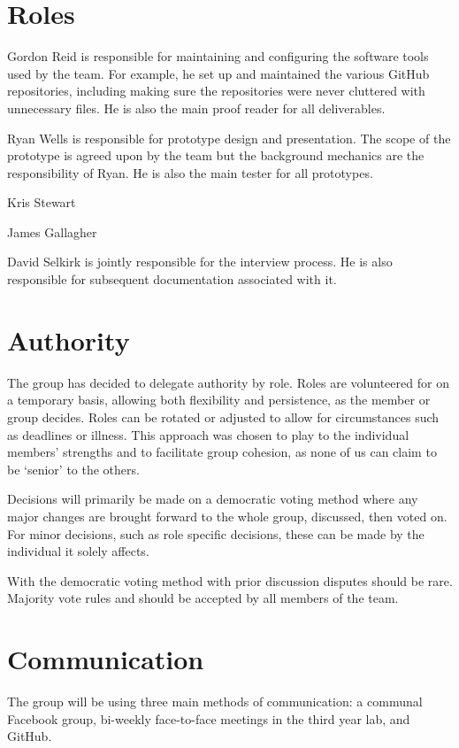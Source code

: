 \documentclass{l3deliverable}
\begin{document}
\pagebreak

\section{Roles}

Gordon Reid is responsible for maintaining and configuring the software tools
used by the team. For example, he set up and maintained the various GitHub
repositories, including making sure the repositories were never cluttered
with unnecessary files. He is also the main proof reader for all
deliverables.

Ryan Wells is responsible for prototype design and presentation. The scope
of the prototype is agreed upon by the team but the background mechanics
are the responsibility of Ryan. He is also the main tester for all prototypes.

Kris Stewart

James Gallagher

David Selkirk is jointly responsible for the interview process. He is also responsible
for subsequent documentation associated with it.

\section{Authority}

The group has decided to delegate authority by role. Roles are volunteered for
on a temporary basis, allowing both flexibility and persistence, as the
member or group decides. Roles can be rotated or adjusted to allow for
circumstances such as deadlines or illness. This approach was chosen to play
to the individual members' strengths and to facilitate group cohesion, as none
of us can claim to be `senior' to the others.

Decisions will primarily be made on a democratic voting method where any
major changes are brought forward to the whole group, discussed, then voted
on. For minor decisions, such as role specific decisions, these can be made
by the individual it solely affects.

With the democratic voting method with prior discussion disputes should be
rare. Majority vote rules and should be accepted by all members of the team.

\section{Communication}
\label{sec:com}

The group will be using three main methods of communication: a communal
Facebook group, bi-weekly face-to-face meetings in the third year lab,
and GitHub.
\end{document}
